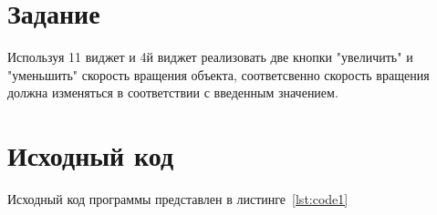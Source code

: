 \documentclass[a4paper, 14pt]{extarticle}
\begin{document}
\renewcommand{\ttdefault}{pcr}

\setlength{\tabcolsep}{3pt}
\newpage
\setcounter{page}{2}

\section{Задание}\label{Sect::task}
Используя 11 виджет и 4й виджет реализовать две кнопки "увеличить" и "уменьшить" скорость вращения объекта, соответсвенно скорость вращения должна изменяться в соответствии с введенным значением.
\newpage
\section{Исходный код}

Исходный код программы представлен в листинге~\ref{lst:code1}
\end{document}

